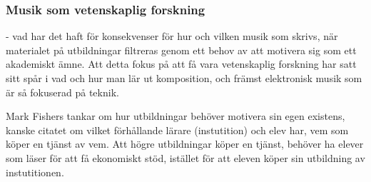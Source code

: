 \documentclass{article}
\begin{document}



\subsubsection{Musik som vetenskaplig forskning}
- vad har det haft för konsekvenser för hur och vilken musik som skrivs, när materialet på utbildningar filtreras
  genom ett behov av att motivera sig som ett akademiskt ämne. Att detta fokus på att få vara vetenskaplig
  forskning har satt sitt spår i vad och hur man lär ut komposition, och främst elektronisk musik som är så
  fokuserad på teknik. 

  Mark Fishers tankar om hur utbildningar behöver motivera sin egen existens, kanske citatet om vilket
  förhållande lärare (instutition) och elev har, vem som köper en tjänst av vem. Att högre utbildningar
  köper en tjänst, behöver ha elever som läser för att få ekonomiskt stöd, istället för att eleven köper sin
  utbildning av instutitionen. 

	










\end{document}
